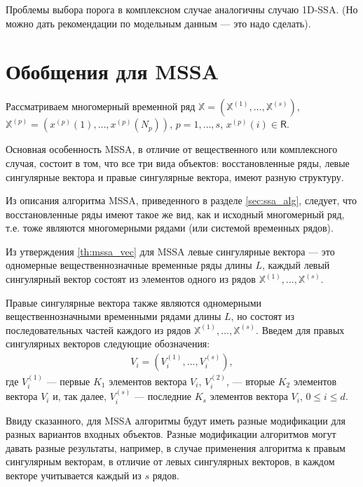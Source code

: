 \documentclass[specialist,
               substylefile = spbu.rtx,
               subf,href,colorlinks=true, 12pt]{disser}
\begin{document}
Проблемы выбора порога в комплексном случае аналогичны случаю 1D-SSA.
(Но можно дать рекомендации по модельным данным --- это надо сделать).

\section{Обобщения для MSSA}

Рассматриваем многомерный временной ряд $\mathbb{X}= \left(\mathbb{X}^{(1)}, \ldots,\mathbb{X}^{(s)}\right)$,\\ $\mathbb{X}^{(p)}= \left(x^{(p)}(1),\ldots,x^{(p)}(N_p)\right)$, $p=1,\ldots,s$, $x^{(p)}(i) \in \mathsf{R}$. 

Основная особенность MSSA, в отличие от вещественного или комплексного случая, состоит в том, что все три вида объектов: восстановленные ряды, левые сингулярные вектора и правые сингулярные вектора, имеют разную структуру.

Из описания алгоритма MSSA, приведенного в разделе \ref{sec:ssa_alg}, следует, что восстановленные ряды имеют такое же вид, как и исходный многомерный ряд, т.е. тоже являются многомерными рядами (или системой временных рядов). 

Из утверждения \ref{th:mssa_vec} для MSSA левые сингулярные вектора --- это одномерные вещественнозначные временные ряды
 длины $L$, каждый левый сингулярный вектор состоят из элементов одного из рядов $\mathbb{X}^{(1)}, \ldots, \mathbb{X}^{(s)}$. 
 
 Правые сингулярные вектора также являются одномерными вещественнозначными временными рядами длины $L$, но состоят из 
последовательных частей каждого из рядов $\mathbb{X}^{(1)}, \ldots, \mathbb{X}^{(s)}$.
Введем для правых сингулярных векторов следующие обозначения: 
\begin{gather} \label{eq:V_mssa}
{V}_{i} = \left({V}_i^{(1)}, \ldots, {V}_i^{(s)}\right), 
\end{gather}
где $V_i^{(1)}$ --- первые $K_1$ элементов вектора ${V}_{i}$,  $V_i^{(2)}$, --- вторые $K_2$ элементов вектора ${V}_{i}$ и, так далее, $V_i^{(s)}$ --- последние $K_s$ элементов вектора ${V}_{i}$, $0 \leqslant i \leqslant d$. 

Ввиду сказанного, для MSSA алгоритмы будут иметь разные модификации для разных вариантов входных объектов. Разные модификации алгоритмов могут давать разные результаты, например, в случае применения алгоритма к правым сингулярным векторам, в отличие от левых сингулярных векторов, в каждом векторе учитывается каждый из $s$ рядов.  
 
\end{document}
